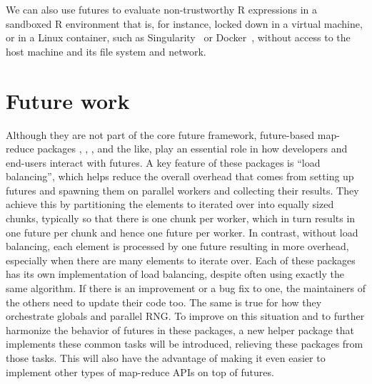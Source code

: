 We can also use futures to evaluate non-trustworthy R expressions in a
sandboxed R environment that is, for instance, locked down in a
virtual machine, or in a Linux container, such as
Singularity~\citep{Kurtzer2017} or Docker~\citep{Merkel2014}, without
access to the host machine and its file system and network.



\vspace{-1ex} %
\section{Future work}
\label{future-work}

Although they are not part of the core future framework, future-based
map-reduce packages , , ,
and the like, play an essential role in how developers and end-users
interact with futures.  A key feature of these packages is ``load
balancing'', which helps reduce the overall overhead that comes from
setting up futures and spawning them on parallel workers and
collecting their results.  They achieve this by partitioning the
elements to iterated over into equally sized chunks, typically so that
there is one chunk per worker, which in turn results in one future per
chunk and hence one future per worker.  In contrast, without load
balancing, each element is processed by one future resulting in more
overhead, especially when there are many elements to iterate over.
Each of these packages has its own implementation of load balancing,
despite often using exactly the same algorithm.  If there is an
improvement or a bug fix to one, the maintainers of the others need to
update their code too.  The same is true for how they orchestrate
globals and parallel RNG.  To improve on this situation and to further
harmonize the behavior of futures in these packages, a new helper
package  that implements these common tasks will
be introduced, relieving these packages from those tasks.  This will
also have the advantage of making it even easier to implement other
types of map-reduce APIs on top of futures.

